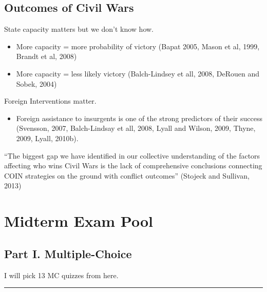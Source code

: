\documentclass[
]{book}
\providecommand{\tightlist}{%
  \setlength{\itemsep}{0pt}\setlength{\parskip}{0pt}}
\begin{document}
\hypertarget{outcomes-of-civil-wars}{%
\section{Outcomes of Civil Wars}\label{outcomes-of-civil-wars}}

State capacity matters but we don't know how.

\begin{itemize}
\item
  More capacity = more probability of victory (Bapat 2005, Mason et al, 1999, Brandt et al, 2008)
\item
  More capacity = less likely victory (Balch-Lindsey et all, 2008, DeRouen and Sobek, 2004)
\end{itemize}

Foreign Interventions matter.

\begin{itemize}
\tightlist
\item
  Foreign assistance to insurgents is one of the strong predictors of their success (Svensson, 2007, Balch-Lindsay et all, 2008, Lyall and Wilson, 2009, Thyne, 2009, Lyall, 2010b).
\end{itemize}

``The biggest gap we have identified in our collective understanding of the factors affecting who wins Civil Wars is the lack of comprehensive conclusions connecting COIN strategies on the ground with conflict outcomes'' (Stojeck and Sullivan, 2013)

\hypertarget{midterm-exam-pool}{%
\chapter*{Midterm Exam Pool}\label{midterm-exam-pool}}

\hypertarget{part-i.-multiple-choice}{%
\section*{Part I. Multiple-Choice}\label{part-i.-multiple-choice}}

I will pick 13 MC quizzes from here.

\begin{center}\rule{0.5\linewidth}{0.5pt}\end{center}
\end{document}
